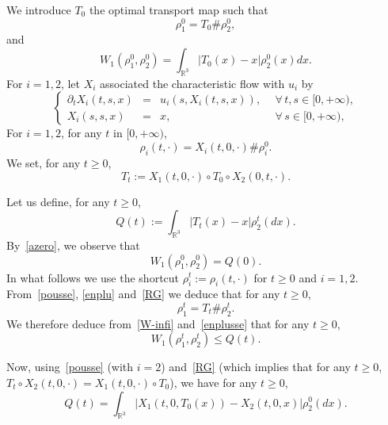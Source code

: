 \documentclass[AHL,Unicode,longabstracts,published]{cedram}
\newcommand{\R}{\mathbb{R}}
\renewcommand{\leq}{\leqslant}
\renewcommand{\geq}{\geqslant}
\let\oldforall\forall
\renewcommand*{\forall}{\mathrel{\oldforall}}
\begin{document}
We introduce $T_0$ the optimal transport map such that
\begin{equation}\label{enplu}
\rho_1^0=T_0\#\rho_2^0,
\end{equation}
and
\begin{equation}\label{azero}
W_1\left(\rho_1^0,\rho_2^0\right)=\int_{\R^3} |T_0(x)-x| \rho_2^0(x) dx.
\end{equation}
For $i=1,2$, let $X_i$ associated the characteristic flow with $u_i$ by
\begin{equation}\label{cflow}
\left \{
\begin{array}{rcll}
\partial_t X_i(t,s,x) & = & u_i(s, X_i(t,s,x)),&\: \: \forall \, t,s\in[0,+\infty), \\
X_i(s,s,x) & = & x,& \: \: \forall \, s \in [0,+\infty),
\end{array}
\right.
\end{equation}
For $i=1,2$, for any $t$ in $[0,+\infty)$,
\begin{equation}\label{pousse}
\rho_i (t,\cdot) =X_i (t,0,\cdot) \#\rho_i^0.
\end{equation}
We set, for any $t\geq 0$,
\begin{equation}\label{RG}
T_t :=X_1(t,0,\cdot) \circ T_0 \circ X_2(0,t,\cdot).
\end{equation}

Let us define, for any $t\geq 0$,
\begin{equation*}
Q(t) := \int_{\R^3} |T_t(x) -x| \rho_2^t(dx).
\end{equation*}
By~\eqref{azero}, we observe that
\begin{equation}\label{prem-zero}
W_1 \left(\rho_1^0,\rho_2^0\right) =Q(0).
\end{equation}
In what follows we use the shortcut $\rho_i^t:=\rho_i(t,\cdot)$ for $t\geq 0 $ and $i=1,2$. From~\eqref{pousse}, \eqref{enplu} and~\eqref{RG} we deduce that for any $t\geq 0$,
\begin{equation}\label{enplusse}
\rho_1^t=T_t \#\rho_2^t.
\end{equation}
We therefore deduce from~\eqref{W-infi} and~\eqref{enplusse} that for any $t\geq 0$,
\begin{equation}\label{prem}
W_1 (\rho_1^t,\rho_2^t) \leq Q(t).
\end{equation}

Now, using~\eqref{pousse} (with $i=2$) and~\eqref{RG} (which implies that for any $t\geq 0$, $T_t \circ X_2(t,0,\cdot)=X_1(t,0,\cdot) \circ T_0 $), we have for any $t\geq 0$,
\begin{equation}\label{reexpQ}
Q(t) = \int_{\R^3} \left| X_1\left(t,0,T_0 (x)\right) -X_2(t,0,x)\right| \rho_2^0(dx).
\end{equation}
\end{document}
